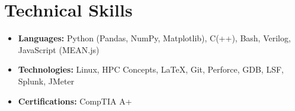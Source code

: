 \documentclass[11pt,letterpaper,sans]{moderncv}
\begin{document}
\section{Technical Skills}

\vspace{2pt}

\begin{itemize}
\item[]  \textbf{Languages:} Python (Pandas, NumPy, Matplotlib), C(++), Bash, Verilog, JavaScript (MEAN.js)
\vspace{3pt}
\item[]  \textbf{Technologies:} Linux, HPC Concepts, LaTeX, Git, Perforce, GDB, LSF, Splunk, JMeter
\vspace{3pt}



\item[]  \textbf{Certifications:} CompTIA A+

\end{itemize}


%
%


\end{document}
